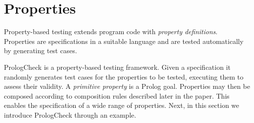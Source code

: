 \documentclass[runningheads,a4paper]{../../PaperStyles/llncs}
\newcommand{\todo}[2][?]{\marginpar{\raggedright \tiny TODO: #2}}
\newcommand{\Prolog}[0]{{\sf Prolog}}
\newcommand{\plqc}[0]{{\sf PrologCheck}}
\begin{document}

\section{Properties}
\label{sec:properties}

Property-based testing extends program code with {\em property definitions}.
%
Properties are specifications in a suitable language and are tested
automatically by generating test cases.



\plqc{} is a property-based testing framework.
%
%
Given a specification it randomly generates test cases for the properties to be tested,
 executing them to assess their validity.
%
A \emph{primitive property} is a \Prolog{} goal. %
%
Properties may then be composed according to composition rules described
later in the paper.
%
This enables the specification of a wide range of properties. %
%
%
Next, in this section we introduce \plqc{} through an example.
\end{document}
